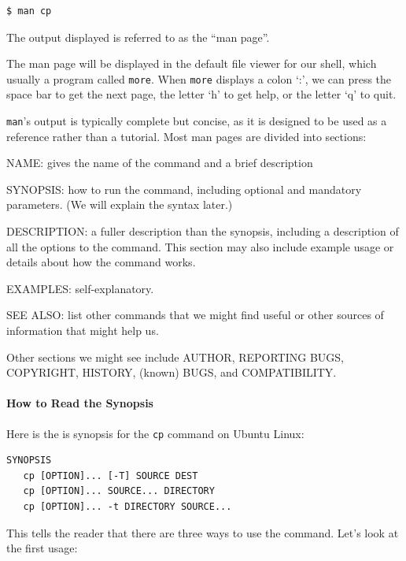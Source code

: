 \documentclass{book}
\begin{document}
\begin{verbatim}
$ man cp
\end{verbatim}

The output displayed is referred to as the ``man page''.

The man page will be displayed in the default file viewer for our shell,
which usually a program called \texttt{more}. When \texttt{more}
displays a colon `:', we can press the space bar to get the next page,
the letter `h' to get help, or the letter `q' to quit.

\texttt{man}'s output is typically complete but concise, as it is
designed to be used as a reference rather than a tutorial. Most man
pages are divided into sections:

\begin{swcitemize}
\item
  NAME: gives the name of the command and a brief description
\item
  SYNOPSIS: how to run the command, including optional and mandatory
  parameters. (We will explain the syntax later.)
\item
  DESCRIPTION: a fuller description than the synopsis, including a
  description of all the options to the command. This section may also
  include example usage or details about how the command works.
\item
  EXAMPLES: self-explanatory.
\item
  SEE ALSO: list other commands that we might find useful or other
  sources of information that might help us.
\end{swcitemize}

Other sections we might see include AUTHOR, REPORTING BUGS, COPYRIGHT,
HISTORY, (known) BUGS, and COMPATIBILITY.

\mbox{}\paragraph{How to Read the Synopsis}

Here is the is synopsis for the \texttt{cp} command on Ubuntu Linux:

\begin{verbatim}
SYNOPSIS
   cp [OPTION]... [-T] SOURCE DEST
   cp [OPTION]... SOURCE... DIRECTORY
   cp [OPTION]... -t DIRECTORY SOURCE...
\end{verbatim}

This tells the reader that there are three ways to use the command.
Let's look at the first usage:
\end{document}
